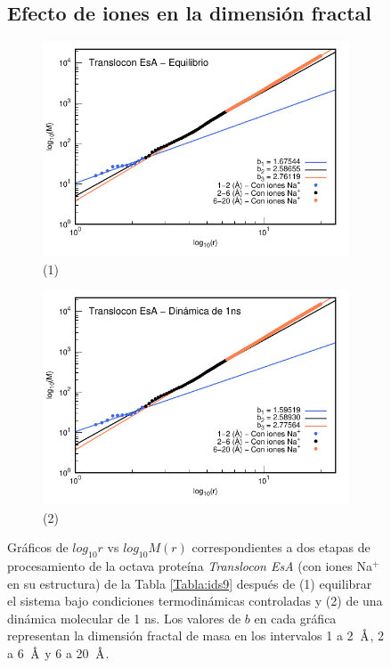 	\begin{figure}[H]
		\subsection*{Efecto de iones en la dimensi\'{o}n fractal}	
		\centering
		\begin{subfigure}{0.49\textwidth}
			\centering
			\includegraphics[width=\linewidth,page=1]{graphs/PDBs/7khw/ions/7khwEq-wions.pdf}
			\caption{(1)}
		\end{subfigure}
		\hfill
		\begin{subfigure}{0.49\textwidth}
			\centering
			\includegraphics[width=\linewidth,page=1]{graphs/PDBs/7khw/ions/7khw1ns-wions.pdf}
			\caption{(2)}
		\end{subfigure}
		\caption{Gr\'{a}ficos de $log_{10}r$ vs $log_{10}M(r)$ correspondientes a dos etapas de procesamiento de la octava prote\'{i}na \textit{Translocon EsA} (con iones Na$^{+}$ en su estructura) de la Tabla \ref{Tabla:ids9} despu\'{e}s de (1) equilibrar el sistema bajo condiciones termodin\'{a}micas controladas y (2) de una din\'{a}mica molecular de 1 ns. Los valores de $b$ en cada gr\'{a}fica representan la dimensi\'{o}n fractal de masa en los intervalos 1 a 2~$\textup{\r{A}}$, 2 a 6~$\textup{\r{A}}$ y 6 a 20~$\textup{\r{A}}$.}
		\label{fig:7khw-wions}
	\end{figure}
	

